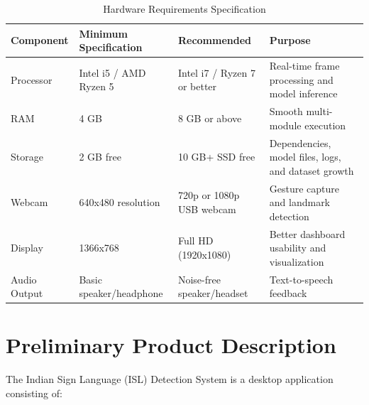 \begin{table}[H]
\centering
\begin{tabular}{|p{3.2cm}|p{3.8cm}|p{3.2cm}|p{3.4cm}|}
\hline
\textbf{Component} & \textbf{Minimum Specification} & \textbf{Recommended} & \textbf{Purpose} \\
\hline
Processor & Intel i5 / AMD Ryzen 5 & Intel i7 / Ryzen 7 or better & Real-time frame processing and model inference \\
\hline
RAM & 4 GB & 8 GB or above & Smooth multi-module execution \\
\hline
Storage & 2 GB free & 10 GB+ SSD free & Dependencies, model files, logs, and dataset growth \\
\hline
Webcam & 640x480 resolution & 720p or 1080p USB webcam & Gesture capture and landmark detection \\
\hline
Display & 1366x768 & Full HD (1920x1080) & Better dashboard usability and visualization \\
\hline
Audio Output & Basic speaker/headphone & Noise-free speaker/headset & Text-to-speech feedback \\
\hline
\end{tabular}
\caption{Hardware Requirements Specification}
\end{table}

\section{Preliminary Product Description}

The Indian Sign Language (ISL) Detection System is a desktop application consisting of:

